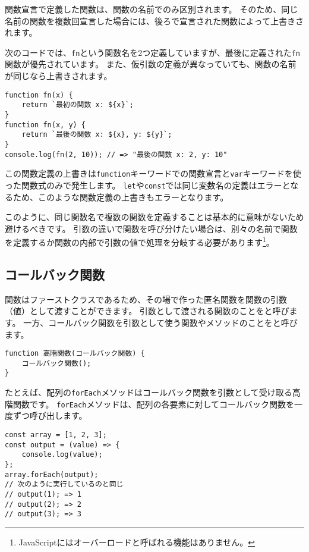\begin{tcolorbox}[title=同じ名前の関数宣言は上書きされる]\label{function-overwrite}

関数宣言で定義した関数は、関数の名前でのみ区別されます。
そのため、同じ名前の関数を複数回宣言した場合には、後ろで宣言された関数によって上書きされます。

次のコードでは、\texttt{fn}という関数名を2つ定義していますが、最後に定義された\texttt{fn}関数が優先されています。
また、仮引数の定義が異なっていても、関数の名前が同じなら上書きされます。

\begin{lstlisting}
function fn(x) {
    return `最初の関数 x: ${x}`;
}
function fn(x, y) {
    return `最後の関数 x: ${x}, y: ${y}`;
}
console.log(fn(2, 10)); // => "最後の関数 x: 2, y: 10"
\end{lstlisting}

この関数定義の上書きは\texttt{function}キーワードでの関数宣言と\texttt{var}キーワードを使った関数式のみで発生します。
\texttt{let}や\texttt{const}では同じ変数名の定義はエラーとなるため、このような関数定義の上書きもエラーとなります。

このように、同じ関数名で複数の関数を定義することは基本的に意味がないため避けるべきです。
引数の違いで関数を呼び分けたい場合は、別々の名前で関数を定義するか関数の内部で引数の値で処理を分岐する必要があります\footnote{JavaScriptにはオーバーロードと呼ばれる機能はありません。}。
\end{tcolorbox}

\hypertarget{callback}{%
\subsection{コールバック関数}\label{callback}}

関数はファーストクラスであるため、その場で作った匿名関数を関数の引数（値）として渡すことができます。
引数として渡される関数のことを\textbf{}と呼びます。
一方、コールバック関数を引数として使う関数やメソッドのことを\textbf{}と呼びます。

\begin{lstlisting}
function 高階関数(コールバック関数) {
    コールバック関数();
}
\end{lstlisting}

たとえば、配列の\texttt{forEach}メソッドはコールバック関数を引数として受け取る高階関数です。
\texttt{forEach}メソッドは、配列の各要素に対してコールバック関数を一度ずつ呼び出します。

\begin{lstlisting}
const array = [1, 2, 3];
const output = (value) => {
    console.log(value);
};
array.forEach(output);
// 次のように実行しているのと同じ
// output(1); => 1
// output(2); => 2
// output(3); => 3
\end{lstlisting}

